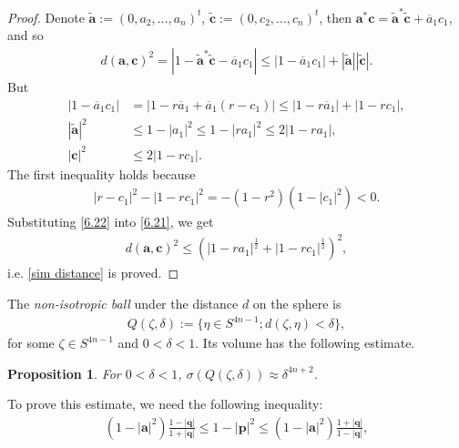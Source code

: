 \documentclass[a4paper,11pt]{amsart}
\numberwithin{equation}{section}
\newtheorem{prop}{Proposition}[section]
\begin{document}
\begin{proof}
  Denote $\widetilde{\mathbf{a}}:=(0,a_2,\dots,a_n)^t$, $\widetilde{\mathbf{c}}:=(0,c_2,\dots,c_n)^t$, then $\mathbf{a}^*\mathbf{c}=\widetilde{\mathbf{a}}^*\widetilde{\mathbf{c}}+\overline{a}_1c_1$, and so
\begin{equation}\begin{aligned}\label{6.21}
d(\mathbf{a},\mathbf{c})^2=|1-\widetilde{\mathbf{a}}^*\widetilde{\mathbf{c}}-\overline{a}_1c_1|\leq|1-\overline{a}_1c_1|+|\widetilde{\mathbf{a}}||\widetilde{\mathbf{c}}|.
\end{aligned}\end{equation}
But
\begin{equation}\begin{aligned}\label{6.22}
|1-\overline{a}_1c_1|&=|1-r\overline{a}_1+\overline{a}_1(r-c_1)|\leq|1-r\overline{a}_1|+|1-rc_1|,\\
|\widetilde{\mathbf{a}}|^2&\leq 1-|a_1|^2\leq 1-|ra_1|^2\leq 2|1-ra_1|,\\
|\mathbf{c}|^2&\leq 2|1-rc_1|.
\end{aligned}\end{equation}
The first inequality holds because
\begin{equation*}\begin{aligned}
|r-c_1|^2-|1-rc_1|^2=-(1-r^2)(1-|c_1|^2)<0.
\end{aligned}\end{equation*}
Substituting \eqref{6.22} into \eqref{6.21}, we get
\begin{equation}\begin{aligned}
d(\mathbf{a},\mathbf{c})^2\leq\left(|1-ra_1|^{\frac12}+|1-rc_1|^{\frac12}\right)^{2},
\end{aligned}\end{equation}
i.e. \eqref{sim distance} is proved.
\end{proof}
The {\it non-isotropic ball} under the distance $d$ on the sphere is
\begin{equation}\begin{aligned}
Q(\zeta,\delta):=\{\eta\in S^{4n-1};d(\zeta,\eta)<\delta\},
\end{aligned}\end{equation}
for some $\zeta\in S^{4n-1}$ and $0<\delta<1$.
 Its volume has the following estimate.
\begin{prop}\label{delta 2n+1}
For $0<\delta<1$, $\sigma(Q(\zeta,\delta))\approx\delta^{4n+2}$.
\end{prop}
To prove this estimate, we need the following inequality:
\begin{equation}\begin{aligned}\label{1-p}
(1-|\mathbf{a}|^2)\frac{1-|\mathbf{q}|}{1+|\mathbf{q}|}\leq 1-|\mathbf{p}|^2\leq (1-|\mathbf{a}|^2)\frac{1+|\mathbf{q}|}{1-|\mathbf{q}|},
\end{aligned}\end{equation}
\end{document}
